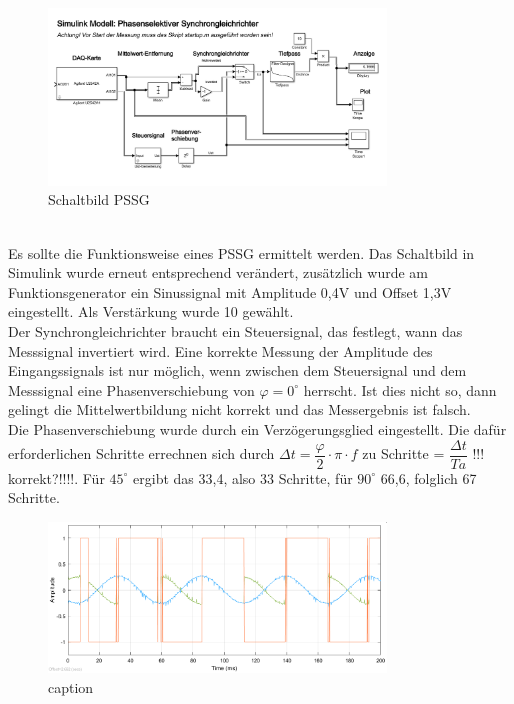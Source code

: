 \begin{figure}[h]
	\centering
	\includegraphics[width=0.8\textwidth]{./img/ch6/6_3_5}
	\caption{Schaltbild PSSG}
	\label{fg:schalt_pssg}
\end{figure}
~\\
Es sollte die Funktionsweise eines PSSG ermittelt werden. Das Schaltbild in Simulink wurde erneut entsprechend verändert, zusätzlich wurde am Funktionsgenerator ein Sinussignal mit Amplitude 0,4V und Offset 1,3V eingestellt. Als Verstärkung wurde 10 gewählt.
~\\
Der Synchrongleichrichter braucht ein Steuersignal, das festlegt, wann das Messsignal invertiert wird. Eine korrekte Messung der Amplitude des Eingangssignals ist nur möglich, wenn zwischen dem Steuersignal und dem Messsignal eine Phasenverschiebung von $\varphi= 0^\circ $ herrscht. Ist dies nicht so, dann gelingt die Mittelwertbildung nicht korrekt und das Messergebnis ist falsch.
~\\
Die Phasenverschiebung wurde durch ein Verzögerungsglied eingestellt. Die dafür erforderlichen Schritte errechnen sich durch $\Delta t = \dfrac{\varphi}{2} \cdot \pi \cdot f$ zu Schritte = $\dfrac{\Delta t}{Ta}$ !!! korrekt?!!!!. Für $45^\circ$  ergibt das 33,4, also 33 Schritte, für $90^\circ$  66,6, folglich 67 Schritte.
~\\
\begin{figure}[h]
  \centering
  \includegraphics[width=0.8\textwidth]{./img/ch6/6_3_5_67s_1}
  \caption{caption}  
\end{figure} 
